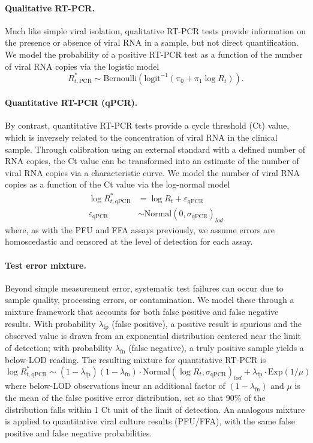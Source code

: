 \documentclass[12pt]{article}
\begin{document}
\paragraph{Qualitative RT-PCR.} Much like simple viral isolation, qualitative RT-PCR tests provide information on the presence or absence of viral RNA in a sample, but not direct quantification. We model the probability of a positive RT-PCR test as a function of the number of viral RNA copies via the logistic model
\begin{equation*}
    R^{*}_{t,\text{PCR}} \sim \text{Bernoulli}(\text{logit}^{-1}(\pi_0 + \pi_1 \log R_t)).
\end{equation*}
\paragraph{Quantitative RT-PCR (qPCR).} By contrast, quantitative RT-PCR tests provide a cycle threshold (Ct) value, which is inversely related to the concentration of viral RNA in the clinical sample. Through calibration using an external standard with a defined number of RNA copies, the Ct value can be transformed into an estimate of the number of viral RNA copies via a characteristic curve. We model the number of viral RNA copies as a function of the Ct value via the log-normal model
\begin{align*}
    \log R^{*}_{t,\text{qPCR}} &= \log R_t + \varepsilon_{\text{qPCR}} \\
    \varepsilon_{\text{qPCR}} &\sim \text{Normal}(0, \sigma_{\text{qPCR}})_{lod}
\end{align*}
where, as with the PFU and FFA assays previously, we assume errors are homoscedastic and censored at the level of detection for each assay.

\paragraph{Test error mixture.} Beyond simple measurement error, systematic test failures can occur due to sample quality, processing errors, or contamination. We model these through a mixture framework that accounts for both false positive and false negative results. With probability $\lambda_{\text{fp}}$ (false positive), a positive result is spurious and the observed value is drawn from an exponential distribution centered near the limit of detection; with probability $\lambda_{\text{fn}}$ (false negative), a truly positive sample yields a below-LOD reading. The resulting mixture for quantitative RT-PCR is
\begin{equation*}
    \log R^{*}_{t,\text{qPCR}} \sim (1 - \lambda_{\text{fp}}) (1 - \lambda_{\text{fn}}) \cdot \text{Normal}(\log R_t, \sigma_{\text{qPCR}})_{lod} + \lambda_{\text{fp}} \cdot \text{Exp}(1/\mu)
\end{equation*}
where below-LOD observations incur an additional factor of $(1 - \lambda_{\text{fn}})$ and $\mu$ is the mean of the false positive error distribution, set so that 90\% of the distribution falls within 1 Ct unit of the limit of detection. An analogous mixture is applied to quantitative viral culture results (PFU/FFA), with the same false positive and false negative probabilities.
\end{document}
